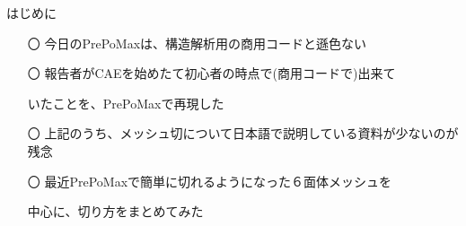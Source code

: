 \begin{frame}{はじめに}
  \begin{itemize}[itemsep=2.5ex, leftmargin=3mm]
      \large
      \item[〇] 今日のPrePoMaxは、構造解析用の商用コードと遜色ない

      \item[〇] 報告者がCAEを始めたて初心者の時点で(商用コードで)出来て

                いたことを、PrePoMaxで再現した

      \item[〇] 上記のうち、メッシュ切について日本語で説明している資料が少ないのが残念

      \item[〇] 最近PrePoMaxで簡単に切れるようになった６面体メッシュを

                中心に、切り方をまとめてみた
  \end{itemize}
\end{frame}
